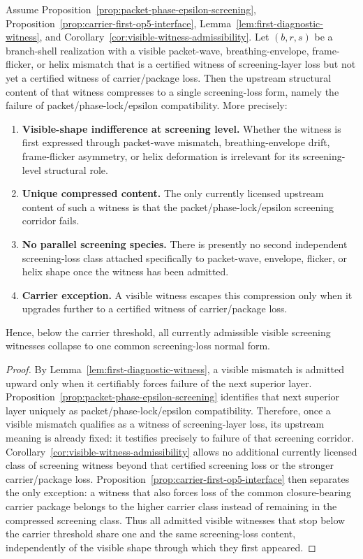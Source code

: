 \begin{lemma}
\label{lem:screening-witness-compression}
Assume Proposition~\ref{prop:packet-phase-epsilon-screening}, Proposition~\ref{prop:carrier-first-op5-interface}, Lemma~\ref{lem:first-diagnostic-witness}, and Corollary~\ref{cor:visible-witness-admissibility}. Let $(b,r,s)$ be a branch-shell realization with a visible packet-wave, breathing-envelope, frame-flicker, or helix mismatch that is a certified witness of screening-layer loss but not yet a certified witness of carrier/package loss. Then the upstream structural content of that witness compresses to a single screening-loss form, namely the failure of packet/phase-lock/epsilon compatibility. More precisely:
\begin{enumerate}[leftmargin=2em,label=(\roman*)]
\item \textbf{Visible-shape indifference at screening level.} Whether the witness is first expressed through packet-wave mismatch, breathing-envelope drift, frame-flicker asymmetry, or helix deformation is irrelevant for its screening-level structural role.
\item \textbf{Unique compressed content.} The only currently licensed upstream content of such a witness is that the packet/phase-lock/epsilon screening corridor fails.
\item \textbf{No parallel screening species.} There is presently no second independent screening-loss class attached specifically to packet-wave, envelope, flicker, or helix shape once the witness has been admitted.
\item \textbf{Carrier exception.} A visible witness escapes this compression only when it upgrades further to a certified witness of carrier/package loss.
\end{enumerate}
Hence, below the carrier threshold, all currently admissible visible screening witnesses collapse to one common screening-loss normal form.
\end{lemma}

\begin{proof}
By Lemma~\ref{lem:first-diagnostic-witness}, a visible mismatch is admitted upward only when it certifiably forces failure of the next superior layer. Proposition~\ref{prop:packet-phase-epsilon-screening} identifies that next superior layer uniquely as packet/phase-lock/epsilon compatibility. Therefore, once a visible mismatch qualifies as a witness of screening-layer loss, its upstream meaning is already fixed: it testifies precisely to failure of that screening corridor. Corollary~\ref{cor:visible-witness-admissibility} allows no additional currently licensed class of screening witness beyond that certified screening loss or the stronger carrier/package loss. Proposition~\ref{prop:carrier-first-op5-interface} then separates the only exception: a witness that also forces loss of the common closure-bearing carrier package belongs to the higher carrier class instead of remaining in the compressed screening class. Thus all admitted visible witnesses that stop below the carrier threshold share one and the same screening-loss content, independently of the visible shape through which they first appeared.
\end{proof}

